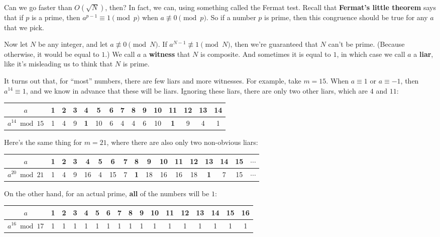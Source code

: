 \documentclass[11pt,paper=letter]{scrartcl}
\begin{document}
Can we go faster than $O(\sqrt{N})$, then? In fact, we can, using something called the Fermat test. Recall that \textbf{Fermat's little theorem} says that if $p$ is a prime, then $a^{p-1} \equiv 1 \pmod p$ when $a \not\equiv 0 \pmod p$. So if a number $p$ is prime, then this congruence should be true for any $a$ that we pick.

Now let $N$ be any integer, and let $a \not\equiv 0 \pmod N$. If $a^{N-1} \not\equiv 1 \pmod N$, then we're guaranteed that $N$ can't be prime. (Because otherwise, it would be equal to $1$.) We call $a$ a \textbf{witness} that $N$ is composite. And sometimes it is equal to $1$, in which case we call $a$ a \textbf{liar}, like it's misleading us to think that $N$ is prime.

It turns out that, for ``most'' numbers, there are few liars and more witnesses. For example, take $m = 15$. When $a \equiv 1$ or $a \equiv -1$, then $a^{14} \equiv 1$, and we know in advance that these will be liars. Ignoring these liars, there are only two other liars, which are $4$ and $11$:

\begin{center}
  \begin{tabular}{c|cccccccccccccc}
  $a$ & 1 & 2 & 3 & \textbf{4} & 5 & 6 & 7 & 8 & 9 & 10 & \textbf{11} & 12 & 13 & 14 \\ \hline
  $a^{14}\bmod 15$ & 1 & 4 & 9 & \textbf{1} & 10 & 6 & 4 & 4 & 6 & 10 & \textbf{1} & 9 & 4 & 1
  \end{tabular}
\end{center}

Here's the same thing for $m = 21$, where there are also only two non-obvious liars:

\begin{center}
  \begin{tabular}{c|cccccccccccccccc}
  $a$ & 1 & 2 & 3 & 4 & 5 & 6 & 7 & \textbf{8} & 9 & 10 & 11 & 12 & \textbf{13} & 14 & 15 & $\cdots$ \\ \hline
  $a^{20}\bmod 21$ & 1 & 4 & 9 & 16 & 4 & 15 & 7 & \textbf{1} & 18 & 16 & 16 & 18 & \textbf{1} & 7 & 15 & $\cdots$
  \end{tabular}
\end{center}

On the other hand, for an actual prime, \textbf{all} of the numbers will be $1$:

\begin{center}
  \begin{tabular}{c|cccccccccccccccc}
  $a$ & 1 & 2 & 3 & 4 & 5 & 6 & 7 & 8 & 9 & 10 & 11 & 12 & 13 & 14 & 15 & 16 \\ \hline
  $a^{16}\bmod 17$ & 1 & 1 & 1 & 1 & 1 & 1 & 1 & 1 & 1 & 1 & 1 & 1 & 1 & 1 & 1 & 1
  \end{tabular}
\end{center}
\end{document}
